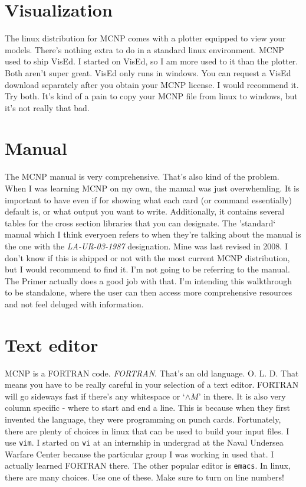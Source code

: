 \documentclass[11pt,a4paper]{article}
\begin{document}
\section{Visualization}
\noindent The linux distribution for MCNP comes with a plotter equipped to view your models. There's nothing extra to do in a standard linux environment. MCNP used to ship VisEd. I started on VisEd, so I am more used to it than the plotter. Both aren't super great. VisEd only runs in windows. You can request a VisEd download separately after you obtain your MCNP license. I would recommend it. Try both. It's kind of a pain to copy your MCNP file from linux to windows, but it's not really that bad.

\section{Manual}
\noindent The MCNP manual is very comprehensive. That's also kind of the problem. When I was learning MCNP on my own, the manual was just overwhemling. It is important to have even if for showing what each card (or command essentially) default is, or what output you want to write. Additionally, it contains several tables for the cross section libraries that you can designate. The 'standard` manual which I think everyoen refers to when they're talking about the manual is the one with the
\textit{LA-UR-03-1987} designation. Mine was last revised in 2008. I don't know if this is shipped or not with the most current MCNP distribution, but I would recommend to find it. I'm not going to be referring to the manual. The Primer actually does a good job with that. I'm intending this walkthrough to be standalone, where the user can then access more comprehensive resources and not feel deluged with information.

\section{Text editor}
\noindent MCNP is a FORTRAN code. \textit{FORTRAN}. That's an old language. O. L. D. That means you have to be really careful in your selection of a text editor. FORTRAN will go sideways fast if there's any whitespace or `$\wedge M$' in there. It is also very column specific - where to start and end a line. This is because when they first invented the language, they were programming on punch cards. Fortunately, there are plenty of choices in linux that can be used to build your input files. I use \texttt{vim}. I started on \texttt{vi} at an internship in undergrad at the Naval Undersea Warfare Center because the particular group I was working in used that. I actually learned FORTRAN there. The other popular editor is \texttt{emacs}. In linux, there are many choices. Use one of these. Make sure to turn on line numbers!
\end{document}
